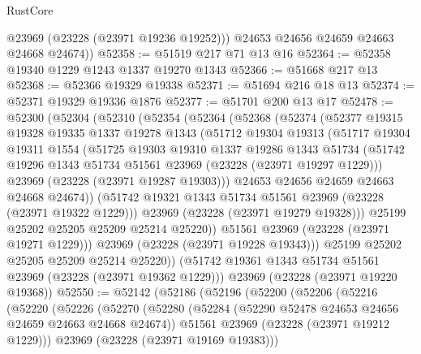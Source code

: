 \begin{lexlean}{RustCore}
\begin{coremodule}
          @23969
          (@23228 (@23971 @19236 @19252)))
        @24653
        @24656
        @24659
        @24663
        @24668
        @24674))
@52358 := @51519 @217 @71 @13 @16
@52364 := @52358 @19340 @1229 @1243 @1337 @19270 @1343
@52366 := @51668 @217 @13
@52368 := @52366 @19329 @19338
@52371 := @51694 @216 @18 @13
@52374 := @52371 @19329 @19336 @1876
@52377 := @51701 @200 @13 @17
@52478 := @52300
    (@52304
      (@52310
        (@52354
          (@52364
            (@52368
              (@52374
                (@52377
                  @19315
                  @19328
                  @19335
                  @1337
                  @19278
                  @1343
                  (@51712
                    @19304
                    @19313
                    (@51717
                      @19304
                      @19311
                      @1554
                      (@51725
                        @19303
                        @19310
                        @1337
                        @19286
                        @1343
                        @51734
                        (@51742 @19296 @1343 @51734 @51561 @23969 (@23228 (@23971 @19297 @1229)))
                        @23969
                        (@23228 (@23971 @19287 @19303)))
                      @24653
                      @24656
                      @24659
                      @24663
                      @24668
                      @24674))
                  (@51742 @19321 @1343 @51734 @51561 @23969 (@23228 (@23971 @19322 @1229)))
                  @23969
                  (@23228 (@23971 @19279 @19328)))
                @25199
                @25202
                @25205
                @25209
                @25214
                @25220))
            @51561
            @23969
            (@23228 (@23971 @19271 @1229)))
          @23969
          (@23228 (@23971 @19228 @19343)))
        @25199
        @25202
        @25205
        @25209
        @25214
        @25220))
    (@51742 @19361 @1343 @51734 @51561 @23969 (@23228 (@23971 @19362 @1229)))
    @23969
    (@23228 (@23971 @19220 @19368))
@52550 := @52142
    (@52186
      (@52196
        (@52200
          (@52206
            (@52216
              (@52220
                (@52226
                  (@52270
                    (@52280
                      (@52284 (@52290 @52478 @24653 @24656 @24659 @24663 @24668 @24674))
                      @51561
                      @23969
                      (@23228 (@23971 @19212 @1229)))
                    @23969
                    (@23228 (@23971 @19169 @19383)))

\end{coremodule}
\end{lexlean}
